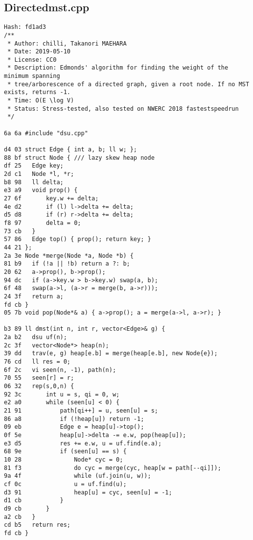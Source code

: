 \documentclass[11pt, a4paper, twoside]{article}
\begin{document}
\subsection{Directedmst.cpp}
\begin{lstlisting}
Hash: fd1ad3
/**
 * Author: chilli, Takanori MAEHARA
 * Date: 2019-05-10
 * License: CC0
 * Description: Edmonds' algorithm for finding the weight of the minimum spanning
 * tree/arborescence of a directed graph, given a root node. If no MST exists, returns -1.
 * Time: O(E \log V)
 * Status: Stress-tested, also tested on NWERC 2018 fastestspeedrun
 */

6a 6a #include "dsu.cpp"

d4 03 struct Edge { int a, b; ll w; };
88 bf struct Node { /// lazy skew heap node
df 25 	Edge key;
2d c1 	Node *l, *r;
b8 98 	ll delta;
e3 a9 	void prop() {
27 6f 		key.w += delta;
4e d2 		if (l) l->delta += delta;
d5 d8 		if (r) r->delta += delta;
f8 97 		delta = 0;
73 cb 	}
57 86 	Edge top() { prop(); return key; }
44 21 };
2a 3e Node *merge(Node *a, Node *b) {
81 b9 	if (!a || !b) return a ?: b;
20 62 	a->prop(), b->prop();
94 dc 	if (a->key.w > b->key.w) swap(a, b);
6f 48 	swap(a->l, (a->r = merge(b, a->r)));
24 3f 	return a;
fd cb }
05 7b void pop(Node*& a) { a->prop(); a = merge(a->l, a->r); }

b3 89 ll dmst(int n, int r, vector<Edge>& g) {
2a b2 	dsu uf(n);
2c 3f 	vector<Node*> heap(n);
39 dd 	trav(e, g) heap[e.b] = merge(heap[e.b], new Node{e});
76 cd 	ll res = 0;
6f 2c 	vi seen(n, -1), path(n);
70 55 	seen[r] = r;
06 32 	rep(s,0,n) {
92 3c 		int u = s, qi = 0, w;
e2 a0 		while (seen[u] < 0) {
21 91 			path[qi++] = u, seen[u] = s;
86 a8 			if (!heap[u]) return -1;
09 eb 			Edge e = heap[u]->top();
0f 5e 			heap[u]->delta -= e.w, pop(heap[u]);
e3 d5 			res += e.w, u = uf.find(e.a);
68 9e 			if (seen[u] == s) {
10 28 				Node* cyc = 0;
81 f3 				do cyc = merge(cyc, heap[w = path[--qi]]);
9a 4f 				while (uf.join(u, w));
cf 0c 				u = uf.find(u);
d3 91 				heap[u] = cyc, seen[u] = -1;
d1 cb 			}
d9 cb 		}
a2 cb 	}
cd b5 	return res;
fd cb }
\end{lstlisting}
\end{document}
